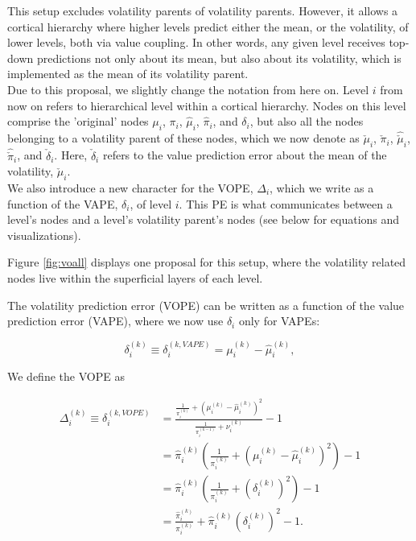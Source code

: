 This setup excludes volatility parents of volatility parents. However, it allows a cortical hierarchy where higher levels predict either the mean, or the volatility, of lower levels, both via value coupling. In other words, any given level receives top-down predictions not only about its mean, but also about its volatility, which is implemented as the mean of its volatility parent.\\

Due to this proposal, we slightly change the notation from here on. Level $i$ from now on refers to hierarchical level within a cortical hierarchy. Nodes on this level comprise the 'original' nodes $\mu_i$, $\pi_i$, $\hat{\mu}_i$, $\hat{\pi}_i$, and $\delta_i$, but also all the nodes belonging to a volatility parent of these nodes, which we now denote as $\check{\mu}_i$, $\check{\pi}_i$, $\hat{\check{\mu}}_i$, $\hat{\check{\pi}}_i$, and $\check{\delta}_i$. Here, $\check{\delta}_i$ refers to the value prediction error about the mean of the volatility, $\check{\mu}_i$. \\

We also introduce a new character for the \textsf{VOPE}, $\Delta_i$, which we write as a function of the \textsf{VAPE}, $\delta_i$, of level $i$. This PE is what communicates between a level's nodes and a level's volatility parent's nodes (see below for equations and visualizations). 


Figure \ref{fig:voall} displays one proposal for this setup, where the volatility related nodes live within the superficial layers of each level. 

The volatility prediction error (\textsf{VOPE}) can be written as a function of the value prediction error (\textsf{VAPE}), where we now use $\delta_i$ only for \textsf{VAPE}s:

\begin{equation}
	\delta_i^{(k)} \equiv \delta_i^{(k, VAPE)} = \mu_i^{(k)} - \hat{\mu}_i^{(k)},
\end{equation}

We define the \textsf{VOPE} as 

\begin{equation}
  \begin{split}
    \Delta_i^{(k)} \equiv \delta_i^{(k, VOPE)} &= \frac{ \frac{1}{\pi_{i}^{(k)}} + (\mu_i^{(k)} - \hat{\mu}_i^{(k)})^2 }{ \frac{1}{\pi_{i}^{(k-1)}} + \nu_{i}^{(k)} } - 1 \\
    &= \hat{\pi}_i^{(k)} \left( \frac{1}{\pi_{i}^{(k)}} + (\mu_i^{(k)} - \hat{\mu}_i^{(k)})^2 \right) - 1 \\
    &= \hat{\pi}_i^{(k)} \left( \frac{1}{\pi_{i}^{(k)}} + (\delta_i^{(k)})^2 \right) - 1 \\
    &=  \frac{\hat{\pi}_i^{(k)}}{\pi_{i}^{(k)}} + \hat{\pi}_i^{(k)} (\delta_i^{(k)})^2 - 1. \\
  \end{split} 
\end{equation}

